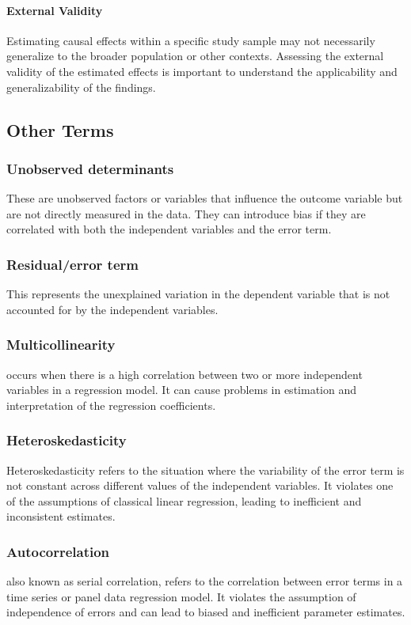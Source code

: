 \documentclass[a3paper, 8pt]{extarticle}
\begin{document}
\begin{multicols*}{5}
\paragraph{External Validity} Estimating causal effects within a specific study sample may not necessarily generalize to the broader population or other contexts. Assessing the external validity of the estimated effects is important to understand the applicability and generalizability of the findings.

\subsection{Other Terms}
\subsubsection{Unobserved determinants} These are unobserved factors or variables that influence the outcome variable but are not directly measured in the data. They can introduce bias if they are correlated with both the independent variables and the error term.

\subsubsection{Residual/error term} This represents the unexplained variation in the dependent variable that is not accounted for by the independent variables.

\subsubsection{Multicollinearity} occurs when there is a high correlation between two or more independent variables in a regression model. It can cause problems in estimation and interpretation of the regression coefficients.

\subsubsection{Heteroskedasticity} Heteroskedasticity refers to the situation where the variability of the error term is not constant across different values of the independent variables. It violates one of the assumptions of classical linear regression, leading to inefficient and inconsistent estimates.

\subsubsection{Autocorrelation} also known as serial correlation, refers to the correlation between error terms in a time series or panel data regression model. It violates the assumption of independence of errors and can lead to biased and inefficient parameter estimates.


\end{multicols*}
\end{document}
